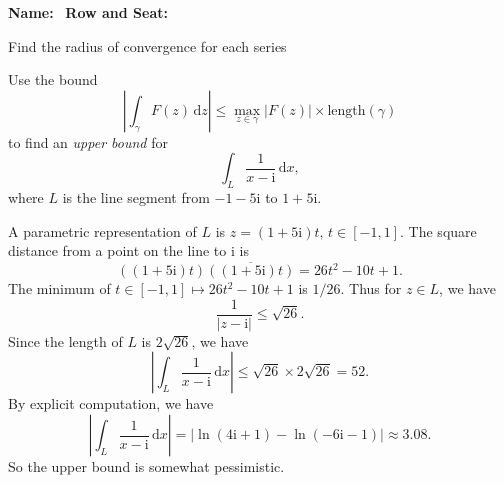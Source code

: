 \documentclass[fleqn,12pt]{exam}
\newcommand{\imag}{\mathrm{i}}
\begin{document}
\large
\vspace{0.1in}
\noindent{}
{\bf Name:}\hrulefill\
\noindent {}
{\bf Row and Seat:}\hrulefill\
\normalsize


\vspace{0.1in}


\begin{questions}


\question Find the radius of convergence for each series

\begin{parts}
\part [10]  $\displaystyle \sum_{k=0}^\infty \frac{1}{1+k^2} x^k$
\begin{solution}[2.0in]
\end{solution}

\part [10]  $\displaystyle \sum_{k=0}^\infty    \frac{(k!)^2}{(3 k)!} x^k$

\begin{solution}[2.0in]
\end{solution}
\end{parts}
\question [10] Use the bound
\begin{equation*}
   \left |  \int_\gamma F(z) \, \mathrm{d} z  \right| \leq \underset{z \in \gamma}{\max} |F(z)| \times \mbox{length}(\gamma)
\end{equation*}
to find an \emph{upper bound} for
\[
    \int_{L}  \frac{1}{x - \imag} \, \mathrm{d} x,
\]
where \(L\) is the line segment from \(-1  - 5 \imag\) to \(1 + 5 \imag\). 

\begin{solution}[2.5in]  A parametric representation of  \(L\) is \(z = (1 + 5 \imag) t, \, t \in [-1,1]\).  The square distance from a point on the line to \(\imag\) is
\[
   \left(  (1 + 5 \imag) t \right)  \overline{  \left(  (1 + 5 \imag) t \right)  }  =  26 t^2-10 t+1.
\]
The minimum of \(t \in [-1,1] \mapsto   26 t^2-10 t+1 \) is \(1 / 26\). Thus for \(z \in L\), we have
\[
   \frac{1}{|z - \imag|} \leq \sqrt{26}.
\]
Since the length of \(L\) is  \(2 \sqrt{26} \), we have
\[
  \left |  \int_{L}  \frac{1}{x - \imag} \, \mathrm{d} x \right | \leq \sqrt{26} \times 2 \sqrt{26} =  52.
\]
By explicit computation, we have
\[
   \left|  \int_{L}  \frac{1}{x - \imag} \, \mathrm{d} x \right | = \left | \ln(4 \imag +1) - \ln (-6 \imag-1) \right| \approx 3.08.
\]
So the upper bound is somewhat pessimistic.
\end{solution}



\end{questions}
\end{document}
